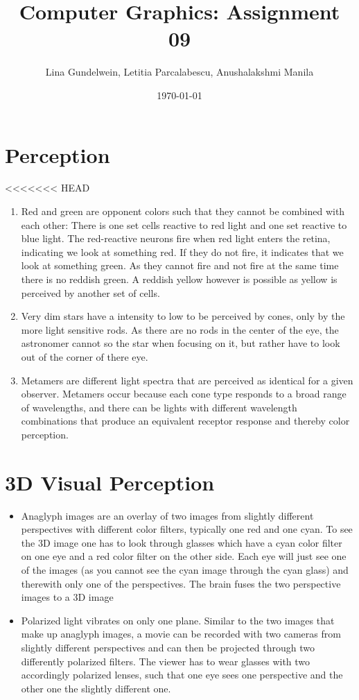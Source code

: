 \documentclass{article}
\title{Computer Graphics: Assignment 09} %
\author{Lina Gundelwein, Letitia Parcalabescu, Anushalakshmi Manila} %
\date{\today} %
\begin{document}
\maketitle 

\section{Perception}
<<<<<<< HEAD
\begin{enumerate}
\item Red and green are opponent colors such that they cannot be combined with each other: There is one set cells reactive to red light and one set reactive to blue light. The red-reactive neurons fire when red light enters the retina, indicating we look at something red. If they do not fire, it indicates that we look at something green. As they cannot fire and not fire at the same time there is no reddish green. A reddish yellow however is possible as yellow is perceived by another set of cells.
\item Very dim stars have a intensity to low to be perceived by cones, only by the more light sensitive rods. As there are no rods in the center of the eye, the astronomer cannot so the star when focusing on it, but rather have to look out of the corner of there eye.
\item Metamers are different light spectra that are perceived as identical for a given observer. Metamers occur because each cone type responds to a broad range of wavelengths, and there can be lights with different wavelength combinations that produce an equivalent receptor response and thereby color perception.
\end{enumerate}

\section{3D Visual Perception}
\begin{itemize}
\item Anaglyph images are an overlay of two images from slightly different perspectives with different color filters, typically one red and one cyan. To see the 3D image one has to look through glasses which have a cyan color filter on one eye and a red color filter on the other side. Each eye will just see one of the images (as you cannot see the cyan image through the cyan glass) and therewith only one of the perspectives. The brain fuses the two perspective images to a 3D image
\item Polarized light vibrates on only one plane. Similar to the two images that make up anaglyph images, a movie can be recorded with two cameras from slightly different perspectives and can then be projected through two differently polarized filters. The viewer has to wear glasses with two accordingly polarized lenses, such that one eye sees one perspective and the other one the slightly different one.
\end{itemize}
\end{document}
